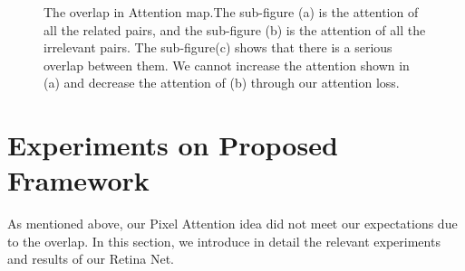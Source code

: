 \begin{figure}[tbph!]
{\begin{minipage}[t]{5cm}
			\label{fig:motor_all1}
	\end{minipage}}
	
	\caption[The overlap in Attention map]{The overlap in Attention map.The sub-figure (a) is the attention of all the related pairs, and the sub-figure (b) is the attention of all the irrelevant pairs. The sub-figure(c) shows that there is a serious overlap between them. We cannot increase the attention shown in (a) and decrease the attention of (b) through our attention loss.}
	\label{fig:overlap}
\end{figure}



\section{Experiments on Proposed Framework}

As mentioned above, our Pixel Attention idea did not meet our expectations due to the overlap. In this section, we introduce in detail the relevant experiments and results of our Retina Net.

